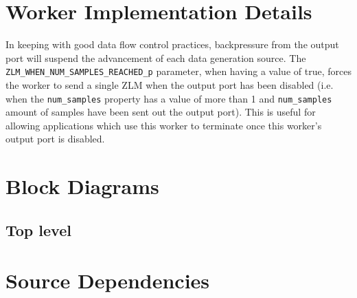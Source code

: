 \documentclass{article}
\def\Comp{TEMP}
\def\Comp{Data\_Src }
\begin{document}
\section*{Worker Implementation Details}
\begin{flushleft}
\justify
  In keeping with good data flow control practices, backpressure from the output port will suspend the advancement of each data generation source. The \verb+ZLM_WHEN_NUM_SAMPLES_REACHED_p+ parameter, when having a value of true, forces the worker to send a single ZLM when the output port has been disabled (i.e. when the \verb+num_samples+ property has a value of more than 1 and \verb+num_samples+ amount of samples have been sent out the output port). This is useful for allowing applications which use this worker to terminate once this worker's output port is disabled.
\end{flushleft}

\section*{Block Diagrams}
\subsection*{Top level}
\begin{center}
\end{center}\pagebreak

\section*{Source Dependencies}
\end{document}
